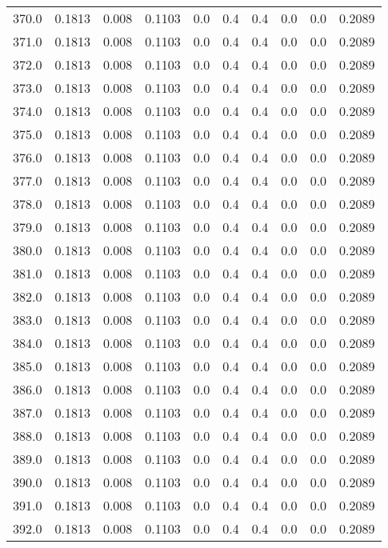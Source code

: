 \begin{longtable}{lrrrrrrrrr}
370.0 & 0.1813 & 0.008 & 0.1103 & 0.0 & 0.4 & 0.4 & 0.0 & 0.0 & 0.2089 \\
371.0 & 0.1813 & 0.008 & 0.1103 & 0.0 & 0.4 & 0.4 & 0.0 & 0.0 & 0.2089 \\
372.0 & 0.1813 & 0.008 & 0.1103 & 0.0 & 0.4 & 0.4 & 0.0 & 0.0 & 0.2089 \\
373.0 & 0.1813 & 0.008 & 0.1103 & 0.0 & 0.4 & 0.4 & 0.0 & 0.0 & 0.2089 \\
374.0 & 0.1813 & 0.008 & 0.1103 & 0.0 & 0.4 & 0.4 & 0.0 & 0.0 & 0.2089 \\
375.0 & 0.1813 & 0.008 & 0.1103 & 0.0 & 0.4 & 0.4 & 0.0 & 0.0 & 0.2089 \\
376.0 & 0.1813 & 0.008 & 0.1103 & 0.0 & 0.4 & 0.4 & 0.0 & 0.0 & 0.2089 \\
377.0 & 0.1813 & 0.008 & 0.1103 & 0.0 & 0.4 & 0.4 & 0.0 & 0.0 & 0.2089 \\
378.0 & 0.1813 & 0.008 & 0.1103 & 0.0 & 0.4 & 0.4 & 0.0 & 0.0 & 0.2089 \\
379.0 & 0.1813 & 0.008 & 0.1103 & 0.0 & 0.4 & 0.4 & 0.0 & 0.0 & 0.2089 \\
380.0 & 0.1813 & 0.008 & 0.1103 & 0.0 & 0.4 & 0.4 & 0.0 & 0.0 & 0.2089 \\
381.0 & 0.1813 & 0.008 & 0.1103 & 0.0 & 0.4 & 0.4 & 0.0 & 0.0 & 0.2089 \\
382.0 & 0.1813 & 0.008 & 0.1103 & 0.0 & 0.4 & 0.4 & 0.0 & 0.0 & 0.2089 \\
383.0 & 0.1813 & 0.008 & 0.1103 & 0.0 & 0.4 & 0.4 & 0.0 & 0.0 & 0.2089 \\
384.0 & 0.1813 & 0.008 & 0.1103 & 0.0 & 0.4 & 0.4 & 0.0 & 0.0 & 0.2089 \\
385.0 & 0.1813 & 0.008 & 0.1103 & 0.0 & 0.4 & 0.4 & 0.0 & 0.0 & 0.2089 \\
386.0 & 0.1813 & 0.008 & 0.1103 & 0.0 & 0.4 & 0.4 & 0.0 & 0.0 & 0.2089 \\
387.0 & 0.1813 & 0.008 & 0.1103 & 0.0 & 0.4 & 0.4 & 0.0 & 0.0 & 0.2089 \\
388.0 & 0.1813 & 0.008 & 0.1103 & 0.0 & 0.4 & 0.4 & 0.0 & 0.0 & 0.2089 \\
389.0 & 0.1813 & 0.008 & 0.1103 & 0.0 & 0.4 & 0.4 & 0.0 & 0.0 & 0.2089 \\
390.0 & 0.1813 & 0.008 & 0.1103 & 0.0 & 0.4 & 0.4 & 0.0 & 0.0 & 0.2089 \\
391.0 & 0.1813 & 0.008 & 0.1103 & 0.0 & 0.4 & 0.4 & 0.0 & 0.0 & 0.2089 \\
392.0 & 0.1813 & 0.008 & 0.1103 & 0.0 & 0.4 & 0.4 & 0.0 & 0.0 & 0.2089 \\

\end{longtable}
